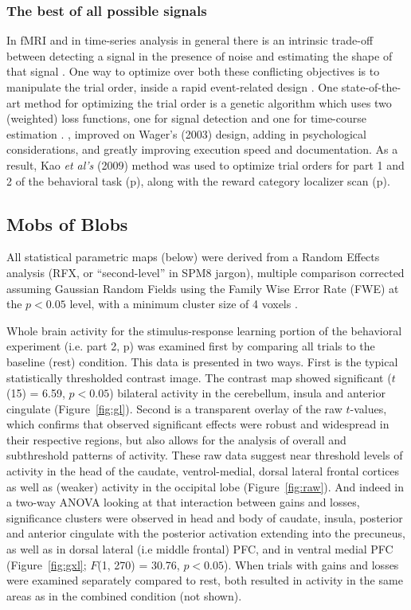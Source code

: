\documentclass[doc,12pt]{apa}        %
\begin{document}
\subsubsection{The best of all possible signals}
\label{subsub:bestsignal}
In fMRI and in time-series analysis in general there is an intrinsic trade-off between detecting a signal in the presence of noise and estimating the shape of that signal \cite{Dale:1999p7901,Birn:2002p1777,Liu:2004p2141}.   One way to optimize over both these conflicting objectives is to manipulate the trial order, inside a rapid event-related design \cite{Miezin:2000p7924}.  One state-of-the-art method for optimizing the trial order is a genetic algorithm which uses two (weighted) loss functions, one for signal detection and one for time-course estimation \cite{Wager:2003p2980}. , improved on Wager's (2003) design, adding in psychological considerations, and greatly improving execution speed and documentation.  As a result, Kao \emph{et al's} (2009) method was used to optimize trial orders for part 1 and 2 of the behavioral task (p\pageref{subsub:whatwhen}), along with the reward category localizer scan (p\pageref{subsub:datadetails}).

\subsection{Mobs of Blobs}
\label{sub:blob}
All statistical parametric maps (below) were derived from a Random Effects analysis (RFX, or ``second-level'' in SPM8 jargon), multiple comparison corrected assuming Gaussian Random Fields using the Family Wise Error Rate (FWE) at the $p < 0.05$ level, with a minimum cluster size of 4 voxels \cite{Worsley:1996p9367}. 

Whole brain activity for the stimulus-response learning portion of the behavioral experiment (i.e. part 2, p\pageref{subsub:whatwhen}) was examined first by comparing all trials to the baseline (rest) condition.  This data is presented in two ways. First is the typical statistically thresholded contrast image.  The contrast map showed significant ($t$(15) = 6.59, $p< 0.05$) bilateral activity in the cerebellum, insula and anterior cingulate (Figure~\ref{fig:gl}).  Second is a transparent overlay of the raw $t$-values, which confirms that observed significant effects were robust and widespread in their respective regions, but also allows for the analysis of overall and subthreshold patterns of activity.  These raw data suggest near threshold levels of activity in the head of the caudate, ventrol-medial, dorsal lateral frontal cortices as well as (weaker) activity in the occipital lobe (Figure~\ref{fig:raw}).  And indeed in a two-way ANOVA looking at that interaction between gains and losses, significance clusters were observed in head and body of caudate, insula, posterior and anterior cingulate with the posterior activation extending into the precuneus, as well as in dorsal lateral (i.e middle frontal) PFC, and in ventral medial PFC (Figure~\ref{fig:gxl}; $F$(1, 270) = 30.76, $p < 0.05$).  When trials with gains and losses were examined separately compared to rest, both resulted in activity in the same areas as in the combined condition (not shown).
\end{document}
